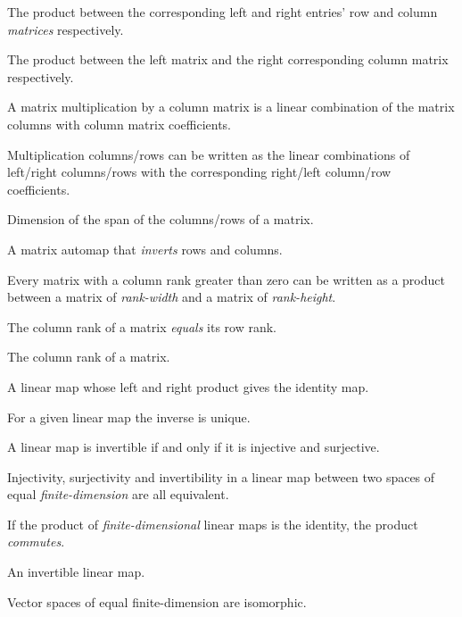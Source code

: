 \begin{multicols}{3}
  The product between the corresponding left and right entries' row and column \textit{matrices} respectively.

  The product between the left matrix and the right corresponding column matrix respectively.

  A matrix multiplication by a column matrix is a linear combination of the
  matrix columns with column matrix coefficients.

  Multiplication columns/rows can be written as the linear combinations of
  left/right columns/rows with
  the corresponding right/left column/row coefficients.
  
  Dimension of the span of the columns/rows of a matrix.

  A matrix automap that \textit{inverts} rows and columns.

  Every matrix with a column rank greater than zero
  can be written as a product between
  a matrix of \textit{rank-width} and a matrix of \textit{rank-height}.

  The column rank of a matrix \textit{equals} its row rank.

  The column rank of a matrix.


  A linear map whose left and right product gives the identity map.

  For a given linear map the inverse is unique.

  A linear map is invertible if and only if it is injective and surjective.

  Injectivity, surjectivity and invertibility in a linear map between two spaces of equal \textit{finite-dimension} are all equivalent.

  If the product of \textit{finite-dimensional} linear maps is the identity, the product \textit{commutes}.

  An invertible linear map.

  Vector spaces of equal finite-dimension are isomorphic.


\end{multicols}
